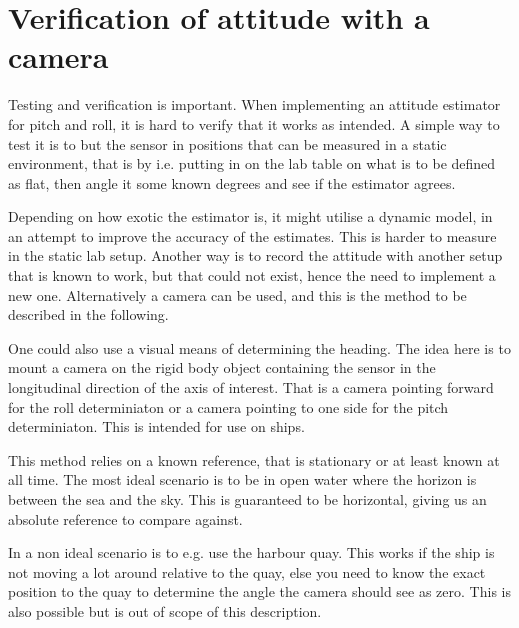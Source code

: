 \chapter{Verification of attitude with a camera}

Testing and verification is important. When implementing an attitude
estimator for pitch and roll, it is hard to verify that it works as
intended. A simple way to test it is to but the sensor in positions
that can be measured in a static environment, that is by i.e. putting
in on the lab table on what is to be defined as flat, then angle it
some known degrees and see if the estimator agrees.

Depending on how exotic the estimator is, it might utilise a dynamic
model, in an attempt to improve the accuracy of the estimates. This is
harder to measure in the static lab setup. Another way is to record
the attitude with another setup that is known to work, but that could
not exist, hence the need to implement a new one. Alternatively a
camera can be used, and this is the method to be described in the
following.

One could also use a visual means of determining the heading. The idea
here is to mount a camera on the rigid body object containing the
sensor in the longitudinal direction of the axis of interest. That is
a camera pointing forward for the roll determiniaton or a camera
pointing to one side for the pitch determiniaton. This is intended for
use on ships.

This method relies on a known reference, that is stationary or at least
known at all time. The most ideal scenario is to be in open water
where the horizon is between the sea and the sky. This is guaranteed
to be horizontal, giving us an absolute reference to compare against.

In a non ideal scenario is to e.g. use the harbour quay. This works if
the ship is not moving a lot around relative to the quay, else you
need to know the exact position to the quay to determine the angle the
camera should see as zero. This is also possible but is out of scope
of this description.

